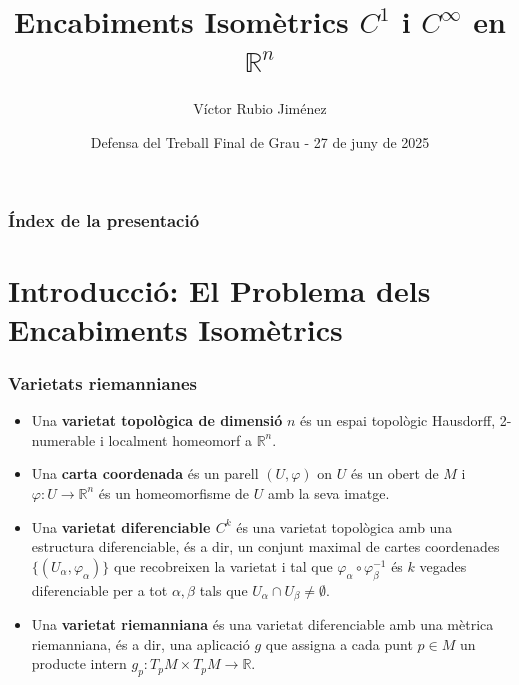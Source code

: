 \documentclass{beamer}
\title[Encabiments Isomètrics $C^1$ i $C^\infty$]{Encabiments Isomètrics $C^1$ i $C^\infty$ en $\mathbb{R}^n$}
\author{Víctor Rubio Jiménez}
\institute{Facultat de Matemàtiques i Informàtica \\ Universitat de Barcelona}
\date{Defensa del Treball Final de Grau - 27 de juny de 2025}
\begin{document}
\begin{frame}
  \titlepage
\end{frame}

\begin{frame}
  \frametitle{Índex de la presentació}
  \tableofcontents
\end{frame}

\section{Introducció: El Problema dels Encabiments Isomètrics}

\begin{frame}
  \frametitle{Varietats riemannianes}
  \begin{itemize}
    \item Una \textbf{varietat topològica de dimensió} $n$ és un espai topològic Hausdorff, 2-numerable i localment homeomorf a $\mathbb{R}^n$.
    \item Una \textbf{carta coordenada} és un parell $(U, \varphi)$ on $U$ és un obert de $M$ i $\varphi: U \to \mathbb{R}^n$ és un homeomorfisme de $U$ amb la seva imatge.
    \item Una \textbf{varietat diferenciable $C^k$} és una varietat topològica amb una estructura diferenciable, és a dir, un conjunt maximal de cartes coordenades $\{(U_\alpha, \varphi_\alpha)\}$ que recobreixen la varietat i tal que $\varphi_\alpha \circ \varphi_\beta^{-1}$ és $k$ vegades diferenciable per a tot $\alpha, \beta$ tals que $U_\alpha \cap U_\beta \neq \emptyset$.
    \item Una \textbf{varietat riemanniana} és una varietat diferenciable amb una mètrica riemanniana, és a dir, una aplicació $g$ que assigna a cada punt $p \in M$ un producte intern $g_p: T_pM \times T_pM \to \mathbb{R}$.
  \end{itemize}
\end{frame}
\end{document}
